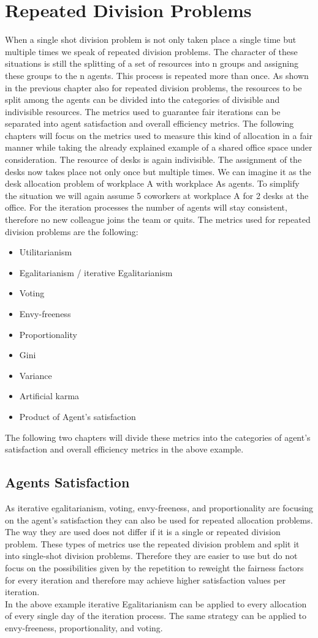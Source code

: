 \documentclass[german, a4paper, 11pt, oneside]{scrbook}
\begin{document}
\section{Repeated Division Problems}
When a single shot division problem is not only taken place a single time but multiple times we speak of repeated division problems. The character of these situations is still the splitting of a set of resources into n groups and assigning these groups to the n agents. This process is repeated more than once. As shown in the previous chapter also for repeated division problems, the resources to be split among the agents can be divided into the categories of divisible and indivisible resources. The metrics used to guarantee fair iterations can be separated into agent satisfaction and overall efficiency metrics. The following chapters will focus on the metrics used to measure this kind of allocation in a fair manner while taking the already explained example of a shared office space under consideration. The resource of desks is again indivisible. The assignment of the desks now takes place not only once but multiple times. We can imagine it as the desk allocation problem of workplace A with workplace As agents. To simplify the situation we will again assume 5 coworkers at workplace A for 2 desks at the office. For the iteration processes the number of agents will stay consistent, therefore no new colleague joins the team or quits. The metrics used for repeated division problems are the following:
\begin{itemize}
  \item Utilitarianism
  \item Egalitarianism / iterative Egalitarianism
  \item Voting
  \item Envy-freeness
  \item Proportionality
\item Gini
\item Variance
\item Artificial karma
\item Product of Agent's satisfaction
\end{itemize}
The following two chapters will divide these metrics into the categories of agent's satisfaction and overall efficiency metrics in the above example.
\subsection{Agents Satisfaction}
As iterative egalitarianism, voting, envy-freeness, and proportionality are focusing on the agent's satisfaction they can also be used for repeated allocation problems. The way they are used does not differ if it is a single or repeated division problem. These types of metrics use the repeated division problem and split it into single-shot division problems. Therefore they are easier to use but do not focus on the possibilities given by the repetition to reweight the fairness factors for every iteration and therefore may achieve higher satisfaction values per iteration.
\\In the above example iterative Egalitarianism can be applied to every allocation of every single day of the iteration process. The same strategy can be applied to envy-freeness, proportionality, and voting. 
\end{document}
